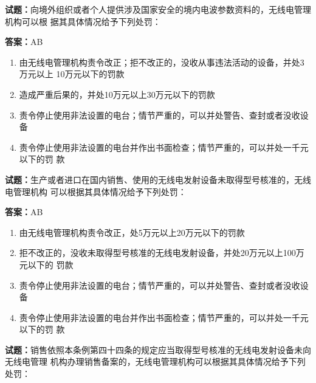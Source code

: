 \documentclass{ctexbook}
\begin{document}
\textbf{试题：}向境外组织或者个人提供涉及国家安全的境内电波参数资料的，无线电管理机构可以根
据其具体情况给予下列处罚： 

\textbf{答案：}AB 

\begin{enumerate}[leftmargin=3em]
  \item 由无线电管理机构责令改正；拒不改正的，没收从事违法活动的设备，并处3万元以上
10万元以下的罚款 

  \item 造成严重后果的，并处10万元以上30万元以下的罚款 

  \item 责令停止使用非法设置的电台；情节严重的，可以并处警告、查封或者没收设备 

  \item 责令停止使用非法设置的电台并作出书面检查；情节严重的，可以并处一千元以下的罚
款 

\end{enumerate}





\vspace{1em}

\textbf{试题：}生产或者进口在国内销售、使用的无线电发射设备未取得型号核准的，无线电管理机构
可以根据其具体情况给予下列处罚： 

\textbf{答案：}AB 

\begin{enumerate}[leftmargin=3em]
  \item 由无线电管理机构责令改正，处5万元以上20万元以下的罚款 

  \item 拒不改正的，没收未取得型号核准的无线电发射设备，并处20万元以上100万元以下的
罚款 

  \item 责令停止使用非法设置的电台；情节严重的，可以并处警告、查封或者没收设备 

  \item 责令停止使用非法设置的电台并作出书面检查；情节严重的，可以并处一千元以下的罚
款 

\end{enumerate}





\vspace{1em}

\textbf{试题：}销售依照本条例第四十四条的规定应当取得型号核准的无线电发射设备未向无线电管理
机构办理销售备案的，无线电管理机构可以根据其具体情况给予下列处罚： 
\end{document}
